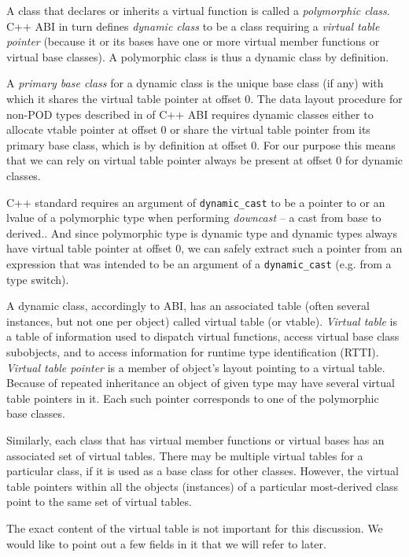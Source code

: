 \documentclass[preprint]{sigplanconf}
\makeatletter
\DeclareRobustCommand{\code}[1]{{\lstinline[breaklines=false,escapechar=@]{#1}}}
\makeatother
\begin{document}
A class that declares or inherits a virtual function is called a 
\emph{polymorphic class}\cite[]{C++0x}. C++ ABI in turn defines 
\emph{dynamic class} to be a class requiring a \emph{virtual table pointer} 
(because it or its bases have one or more virtual member functions or virtual 
base classes). A polymorphic class is thus a dynamic class by definition.

A \emph{primary base class} for a dynamic class is the unique base class (if any) 
with which it shares the virtual table pointer at offset 0. The data layout 
procedure for non-POD types described in  of C++ ABI 
requires dynamic classes either to allocate vtable pointer at offset 0 or share 
the virtual table pointer from its primary base class, which is by definition at 
offset 0. For our purpose this means that we can rely on virtual table pointer 
always be present at offset 0 for dynamic classes.

C++ standard requires an argument of \code{dynamic_cast} to be a pointer to or 
an lvalue of a polymorphic type when performing \emph{downcast} -- a cast from 
base to derived.\cite[.7-6]{C++0x}. And since polymorphic type 
is dynamic type and dynamic types always have virtual table pointer at offset 0, 
we can safely extract such a pointer from an expression that was intended to be 
an argument of a \code{dynamic_cast} (e.g. from a type switch).

A dynamic class, accordingly to ABI, has an associated table (often several 
instances, but not one per object) called virtual table (or vtable). 
\emph{Virtual table} is a table of information used to dispatch virtual 
functions, access virtual base class subobjects, and to access information for 
runtime type identification (RTTI). \emph{Virtual table pointer} is a member of 
object's layout pointing to a virtual table. Because of repeated inheritance an 
object of given type may have several virtual table pointers in it. Each such 
pointer corresponds to one of the polymorphic base classes. 

Similarly, each class that has virtual member functions or virtual bases has an 
associated set of virtual tables. There may be multiple virtual tables for a 
particular class, if it is used as a base class for other classes. However, the 
virtual table pointers within all the objects (instances) of a particular 
most-derived class point to the same set of virtual tables.

The exact content of the virtual table is not important for this discussion. We 
would like to point out a few fields in it that we will refer to later.
\end{document}

